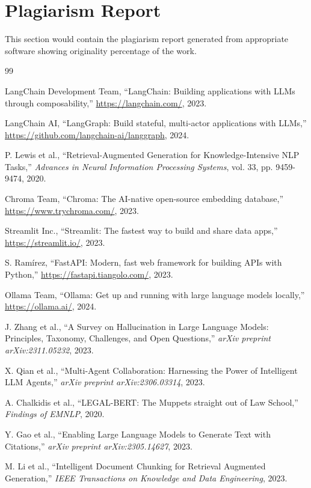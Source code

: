 \documentclass[12pt,singleside,a4paper]{article}
\begin{document}
\section{Plagiarism Report}
This section would contain the plagiarism report generated from appropriate software showing originality percentage of the work.

\pagebreak  
\begin{thebibliography}{99}

LangChain Development Team, ``LangChain: Building applications with LLMs through composability,'' \url{https://langchain.com/}, 2023.

LangChain AI, ``LangGraph: Build stateful, multi-actor applications with LLMs,'' \url{https://github.com/langchain-ai/langgraph}, 2024.

P. Lewis et al., ``Retrieval-Augmented Generation for Knowledge-Intensive NLP Tasks,'' \emph{Advances in Neural Information Processing Systems}, vol. 33, pp. 9459-9474, 2020.

Chroma Team, ``Chroma: The AI-native open-source embedding database,'' \url{https://www.trychroma.com/}, 2023.

Streamlit Inc., ``Streamlit: The fastest way to build and share data apps,'' \url{https://streamlit.io/}, 2023.

S. Ramírez, ``FastAPI: Modern, fast web framework for building APIs with Python,'' \url{https://fastapi.tiangolo.com/}, 2023.

Ollama Team, ``Ollama: Get up and running with large language models locally,'' \url{https://ollama.ai/}, 2024.

J. Zhang et al., ``A Survey on Hallucination in Large Language Models: Principles, Taxonomy, Challenges, and Open Questions,'' \emph{arXiv preprint arXiv:2311.05232}, 2023.

X. Qian et al., ``Multi-Agent Collaboration: Harnessing the Power of Intelligent LLM Agents,'' \emph{arXiv preprint arXiv:2306.03314}, 2023.

A. Chalkidis et al., ``LEGAL-BERT: The Muppets straight out of Law School,'' \emph{Findings of EMNLP}, 2020.

Y. Gao et al., ``Enabling Large Language Models to Generate Text with Citations,'' \emph{arXiv preprint arXiv:2305.14627}, 2023.

M. Li et al., ``Intelligent Document Chunking for Retrieval Augmented Generation,'' \emph{IEEE Transactions on Knowledge and Data Engineering}, 2023.

\end{thebibliography}
\end{document}
